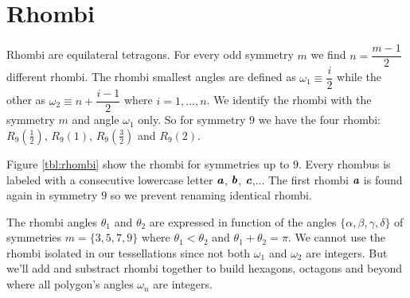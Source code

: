 \documentclass[11pt]{article}
\def\mathbi#1{\textbf{\em #1}}
\begin{document}
\section{Rhombi}

Rhombi are equilateral tetragons. For every odd symmetry $m$ we find $n = \dfrac{m-1}2$ different rhombi. The rhombi smallest angles are defined as $\omega_1 \equiv \dfrac{i}2$ while the other as $\omega_2 \equiv n + \dfrac{i-1}2$ where $i = 1,...,n$. We identify the rhombi with the symmetry $m$ and angle $\omega_1$ only. So for symmetry $9$ we have the four rhombi: $R_9\left(\frac{1}2\right)$, $R_9(1)$, $R_9\left(\frac{3}2\right)$ and $R_9(2)$.

Figure \ref{tbl:rhombi} show the rhombi for symmetries up to $9$. Every rhombus is labeled with a consecutive lowercase letter $\mathbi{a}$, $\mathbi{b}$, $\mathbi{c}$,... The first rhombi $\mathbi{a}$ is found again in symmetry $9$ so we prevent renaming identical rhombi.

The rhombi angles $\theta_1$ and $\theta_2$ are expressed in function of the angles $\{\alpha,\beta,\gamma,\delta\}$ of symmetries $m=\{3,5,7,9\}$ where $\theta_1 < \theta_2$ and $\theta_1 + \theta_2 = \pi$. We cannot use the rhombi isolated in our tessellations since not both $\omega_1$ and $\omega_2$ are integers. But we'll add and substract rhombi together to build hexagons, octagons and beyond where all polygon's angles $\omega_n$ are integers.
\end{document}
